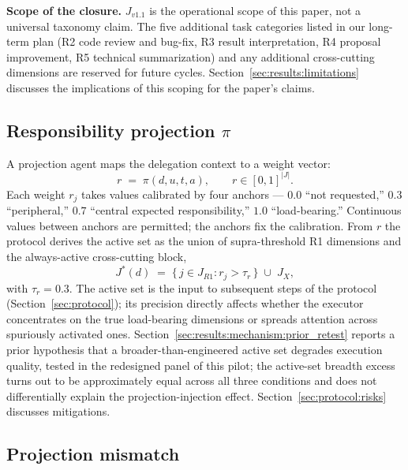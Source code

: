\textbf{Scope of the closure.} $J_{v1.1}$ is the operational scope of this paper, not a universal taxonomy claim. The five additional task categories listed in our long-term plan (R2 code review and bug-fix, R3 result interpretation, R4 proposal improvement, R5 technical summarization) and any additional cross-cutting dimensions are reserved for future cycles. Section~\ref{sec:results:limitations} discusses the implications of this scoping for the paper's claims.

\subsection{Responsibility projection $\pi$}
\label{sec:problem:projection}

A projection agent maps the delegation context to a weight vector:
\begin{equation}
r \;=\; \pi(d, u, t, a), \qquad r \in [0, 1]^{|J|}.
\label{eq:projection}
\end{equation}
Each weight $r_j$ takes values calibrated by four anchors --- $0.0$ ``not requested,'' $0.3$ ``peripheral,'' $0.7$ ``central expected responsibility,'' $1.0$ ``load-bearing.'' Continuous values between anchors are permitted; the anchors fix the calibration. From $r$ the protocol derives the active set as the union of supra-threshold R1 dimensions and the always-active cross-cutting block,
\begin{equation}
J^*(d) \;=\; \{\, j \in J_{R1} : r_j > \tau_r \,\} \;\cup\; J_X,
\label{eq:active_set_problem}
\end{equation}
with $\tau_r = 0.3$. The active set is the input to subsequent steps of the protocol (Section~\ref{sec:protocol}); its precision directly affects whether the executor concentrates on the true load-bearing dimensions or spreads attention across spuriously activated ones. Section~\ref{sec:results:mechanism:prior_retest} reports a prior hypothesis that a broader-than-engineered active set degrades execution quality, tested in the redesigned panel of this pilot; the active-set breadth excess turns out to be approximately equal across all three conditions and does not differentially explain the projection-injection effect. Section~\ref{sec:protocol:risks} discusses mitigations.

\subsection{Projection mismatch}
\label{sec:problem:mismatch}

